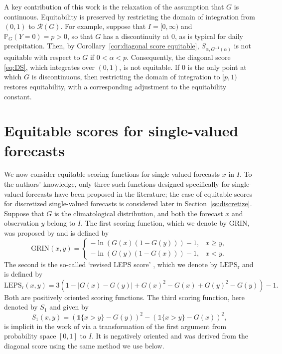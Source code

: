 \documentclass[10pt]{article} %
\theoremstyle{theorem}
\theoremstyle{definition}
\newcommand{\PPP}{\mathbb{P}}
\newcommand{\one}{\mathds{1}}
\newcommand{\LEPSr}{\mathrm{LEPS}_\mathrm{r}}
\newcommand{\Grin}{\mathrm{GRIN}}
\newcommand{\RG}{\mathcal{R}(G)}
\begin{document}
A key contribution of this work is the relaxation of the assumption that $G$ is continuous. Equitability is preserved by restricting the domain of integration from $(0,1)$ to $\RG$. For example, suppose that $I=[0,\infty)$ and $\PPP_G(Y=0)=p>0$, so that $G$ has a discontinuity at $0$, as is typical for daily precipitation. Then, by Corollary~\ref{cor:diagonal score equitable}, $S_{\alpha,G^{-1}(\alpha)}$ is not equitable with respect to $G$ if $0<\alpha<p$. Consequently, the diagonal score \eqref{eq:DS}, which integrates over $(0,1)$, is not equitable. If $0$ is the only point at which $G$ is discontinuous, then restricting the domain of integration to $[p,1)$ restores equitability, with a corresponding adjustment to the equitability constant.


\section{Equitable scores for single-valued forecasts}\label{s:real valued equitable}

We now consider equitable scoring functions for single-valued forecasts $x$ in $I$. To the authors' knowledge, only three such functions designed specifically for single-valued forecasts have been proposed in the literature; the case of equitable scores for discretized single-valued forecasts is considered later in Section~\ref{ss:discretize}. Suppose that $G$ is the climatological distribution, and both the forecast $x$ and observation $y$ belong to $I$. The first scoring function, which we denote by $\Grin$, was proposed by \cite{gringorten1965measure} and is defined by
\begin{equation}\label{eq:Grin}
\Grin(x,y)=
\begin{cases}
-\ln(G(x)(1-G(y))) - 1, & x\geq y, \\
-\ln(G(y)(1-G(x))) - 1, & x < y.
\end{cases}
\end{equation}
The second is the so-called `revised LEPS score' \citep{potts1996revised}, which we denote by $\LEPSr$ and is defined by
\begin{equation}\label{eq:LEPSr}
\LEPSr(x,y)=3(1 - |G(x)-G(y)| + G(x)^2-G(x) + G(y)^2 - G(y)) - 1.
\end{equation}
Both are positively oriented scoring functions. The third scoring function, here denoted by $S_1$ and given by
\begin{equation}\label{eq:S1}
S_1(x,y)= (\one\{x>y\}-G(y))^2 - (\one\{x>y\}-G(x))^2,
\end{equation}
is implicit in the work of \citet[Eq.~3]{ben2021verification} via a transformation of the first argument from probability space $[0,1]$ to $I$. It is negatively oriented and was derived from the diagonal score using the same method we use below.
\end{document}
